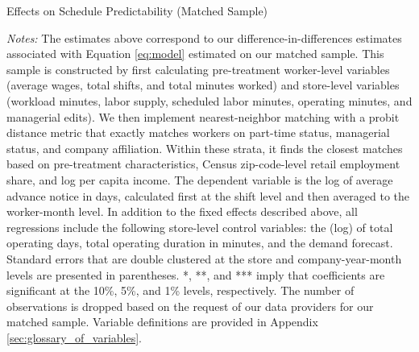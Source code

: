 \documentclass[letterpaper,11pt,leqno]{article}
\theoremstyle{paper}
\newcommand{\note}[2][]{\parbox{\textwidth}{\footnotesize\vspace*{10pt}\textit{#1}#2}}
\begin{document}
\begin{singlespace}
\begin{table}[H]
\caption{Effects on Schedule Predictability (Matched Sample)}

\note{\scriptsize\textit{Notes: }The estimates above correspond to our difference-in-differences estimates associated with Equation \ref{eq:model} estimated on our matched sample. This sample is constructed by first calculating pre-treatment worker-level variables (average wages, total shifts, and total minutes worked) and store-level variables (workload minutes, labor supply, scheduled labor minutes, operating minutes, and managerial edits). We then implement nearest-neighbor matching with a probit distance metric that exactly matches workers on part-time status, managerial status, and company affiliation. Within these strata, it finds the closest matches based on pre-treatment characteristics, Census zip-code-level retail employment share, and log per capita income. The dependent variable is the log of average advance notice in days, calculated first at the shift level and then averaged to the worker-month level. In addition to the fixed effects described above, all regressions include the following store-level control variables: the (log) of total operating days, total operating duration in minutes, and the demand forecast. Standard errors that are double clustered at the store and company-year-month levels are presented in parentheses. *, **, and *** imply that coefficients are significant at the 10\%, 5\%, and 1\% levels, respectively. The number of observations is dropped based on the request of our data providers for our matched sample. Variable definitions are provided in Appendix \ref{sec:glossary_of_variables}.}
\label{table:adv_notice_matched}
\end{table}
\end{singlespace}
\end{document}
